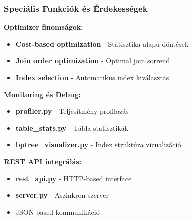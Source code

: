 \documentclass{beamer}
\begin{document}
\begin{frame}
\frametitle{Speciális Funkciók és Érdekességek}

\textbf{Optimizer finomságok:}
\begin{itemize}
    \item \textbf{Cost-based optimization} - Statisztika alapú döntések
    \item \textbf{Join order optimization} - Optimal join sorrend
    \item \textbf{Index selection} - Automatikus index kiválasztás
\end{itemize}

\vspace{0.3cm}
\textbf{Monitoring és Debug:}
\begin{itemize}
    \item \textbf{profiler.py} - Teljesítmény profilozás
    \item \textbf{table\_stats.py} - Tábla statisztikák
    \item \textbf{bptree\_visualizer.py} - Index struktúra vizualizáció
\end{itemize}

\vspace{0.3cm}
\textbf{REST API integrálás:}
\begin{itemize}
    \item \textbf{rest\_api.py} - HTTP-based interface
    \item \textbf{server.py} - Aszinkron szerver
    \item JSON-based kommunikáció
\end{itemize}

\end{frame}
\end{document}
